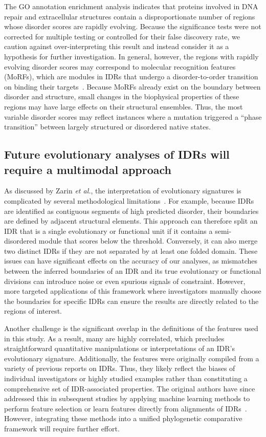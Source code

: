 The GO annotation enrichment analysis indicates that proteins involved in DNA repair and extracellular structures contain a disproportionate number of regions whose disorder scores are rapidly evolving. Because the significance tests were not corrected for multiple testing or controlled for their false discovery rate, we caution against over-interpreting this result and instead consider it as a hypothesis for further investigation. In general, however, the regions with rapidly evolving disorder scores may correspond to molecular recognition features (MoRFs), which are modules in IDRs that undergo a disorder-to-order transition on binding their targets~\cite{Mohan2006, vanderLee2014}. Because MoRFs already exist on the boundary between disorder and structure, small changes in the biophysical properties of these regions may have large effects on their structural ensembles. Thus, the most variable disorder scores may reflect instances where a mutation triggered a ``phase transition'' between largely structured or disordered native states.

\subsection{Future evolutionary analyses of IDRs will require a multimodal approach}
As discussed by Zarin \textit{et al.}, the interpretation of evolutionary signatures is complicated by several methodological limitations~\cite{Zarin2019}. For example, because IDRs are identified as contiguous segments of high predicted disorder, their boundaries are defined by adjacent structural elements. This approach can therefore split an IDR that is a single evolutionary or functional unit if it contains a semi-disordered module that scores below the threshold. Conversely, it can also merge two distinct IDRs if they are not separated by at least one folded domain. These issues can have significant effects on the accuracy of our analyses, as mismatches between the inferred boundaries of an IDR and its true evolutionary or functional divisions can introduce noise or even spurious signals of constraint. However, more targeted applications of this framework where investigators manually choose the boundaries for specific IDRs can ensure the results are directly related to the regions of interest.

Another challenge is the significant overlap in the definitions of the features used in this study. As a result, many are highly correlated, which precludes straightforward quantitative manipulations or interpretations of an IDR's evolutionary signature. Additionally, the features were originally compiled from a variety of previous reports on IDRs. Thus, they likely reflect the biases of individual investigators or highly studied examples rather than constituting a comprehensive set of IDR-associated properties. The original authors have since addressed this in subsequent studies by applying machine learning methods to perform feature selection or learn features directly from alignments of IDRs~\cite{Zarin2021, Lu2022}. However, integrating these methods into a unified phylogenetic comparative framework will require further effort.

